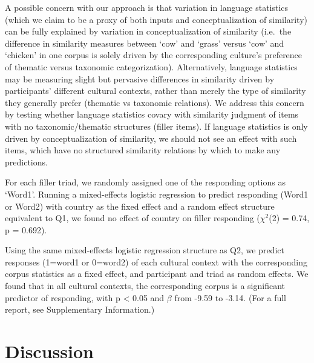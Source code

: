 \documentclass[10pt, letterpaper]{article}
\begin{document}
A possible concern with our approach is that variation in language
statistics (which we claim to be a proxy of both inputs and
conceptualization of similarity) can be fully explained by variation in
conceptualization of similarity (i.e.~the difference in similarity
measures between `cow' and `grass' versus `cow' and `chicken' in one
corpus is solely driven by the corresponding culture's preference of
thematic versus taxonomic categorization). Alternatively, language
statistics may be measuring slight but pervasive differences in
similarity driven by participants' different cultural contexts, rather
than merely the type of similarity they generally prefer (thematic vs
taxonomic relations). We address this concern by testing whether
language statistics covary with similarity judgment of items with no
taxonomic/thematic structures (filler items). If language statistics is
only driven by conceptualization of similarity, we should not see an
effect with such items, which have no structured similarity relations by
which to make any predictions.~

For each filler triad, we randomly assigned one of the responding
options as `Word1'. Running a mixed-effects logistic regression to
predict responding (Word1 or Word2) with country as the fixed effect and
a random effect structure equivalent to Q1, we found no effect of
country on filler responding (\(\chi^2\)(2) = 0.74, p = 0.692).

Using the same mixed-effects logistic regression structure as Q2, we
predict responses (1=word1 or 0=word2) of each cultural context with the
corresponding corpus statistics as a fixed effect, and participant and
triad as random effects. We found that in all cultural contexts, the
corresponding corpus is a significant predictor of responding, with p
\textless{} 0.05 and \(\beta\) from -9.59 to -3.14. (For a full report,
see Supplementary Information.)

\hypertarget{discussion}{%
\section{Discussion}\label{discussion}}
\end{document}
